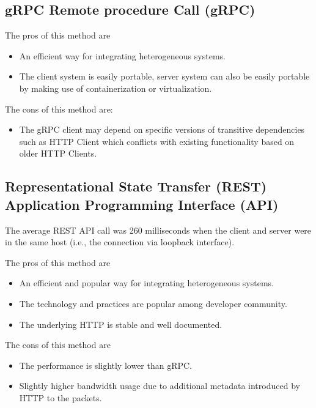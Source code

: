 \subsection{gRPC Remote procedure Call (gRPC)} \label{sec:eval-rpc}

The pros of this method are
\begin{itemize}
\item An efficient way for integrating heterogeneous systems.
\item The client system is easily portable, server system can also be easily portable by making use of containerization or virtualization.
\end{itemize}

The cons of this method are:
\begin{itemize}
  \item The gRPC client may depend on specific versions of transitive dependencies such as HTTP Client which conflicts with existing functionality based on older HTTP Clients.
\end{itemize}

\subsection{Representational State Transfer (REST) Application Programming Interface (API)} \label{sec:eval-rest}

The average REST API call was 260 milliseconds when the client and server were in the same host (i.e., the connection via loopback interface).

The pros of this method are
\begin{itemize}
\item An efficient and popular way for integrating heterogeneous systems.
\item The technology and practices are popular among developer community.
\item The underlying HTTP is stable and well documented.
\end{itemize}

The cons of this method are
\begin{itemize}
\item The performance is slightly lower than gRPC.
\item Slightly higher bandwidth usage due to additional metadata introduced by HTTP to the packets.
\end{itemize}
